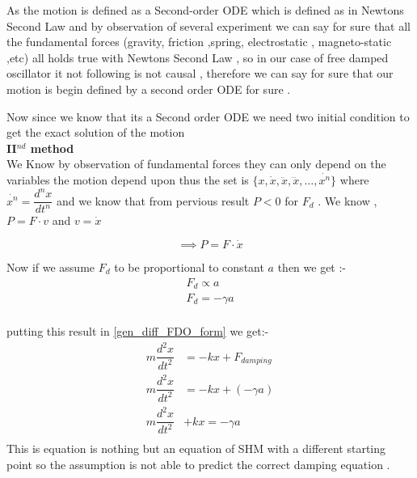 \documentclass[10pt,twoside]{report}
\begin{document}
 As the motion is defined as a Second-order ODE which is defined as in \gls{Newtons Second Law} and by observation of several experiment we can say for sure that all the fundamental forces (gravity, friction ,spring, electrostatic , magneto-static ,etc) all holds true with Newtons Second Law , so in our case of free damped oscillator it not following is not causal , therefore we can say for sure that our motion is begin defined by a second order ODE for sure .
 
 Now since we know that its a Second order ODE we need two initial condition to get the exact solution of the motion 
\\
 
 \textbf{II$^{nd}$ method}\\
 
We Know by observation of fundamental forces they can only depend on the variables the motion depend upon thus the set is $ \{ x , \dot{x}, \ddot{x} , \dddot{x} , \ldots ,\dot{x^n} \} $ where $\dot{x^n} = \dfrac{d^nx}{dt^n} $ and we know that from pervious result  $P<0$ for $F_d$ .
We know , $ P = F \cdot v$ and $ v =\dot{x} $


\begin{equation}
\label{general_power_relation}
    \implies P = F \cdot \dot{x}
\end{equation}

Now if we assume $F_d$ to be proportional to constant $a$ then we get :-
\begin{align*}
    F_d \propto a\\
    F_d = -\gamma a\\
\end{align*}

putting this result in \eqref{gen_diff_FDO_form} we get:-
\begin{align*}
    m \dfrac{d^2x}{dt^2} &= -kx +F_{damping}\\
    m \dfrac{d^2x}{dt^2} &= -kx + (-\gamma a) \\
  m \dfrac{d^2x}{dt^2} &+ kx = -\gamma a \\
\end{align*}
This is equation is nothing but an equation of SHM with a different starting point so the assumption is not able to predict the correct damping equation .
\end{document}
